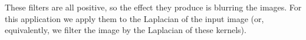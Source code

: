 These filters are all positive, so the effect they produce is blurring the
images.  For this application we apply them to the Laplacian of the input
image (or, equivalently, we filter the image by the Laplacian of these
kernels).

%
%

